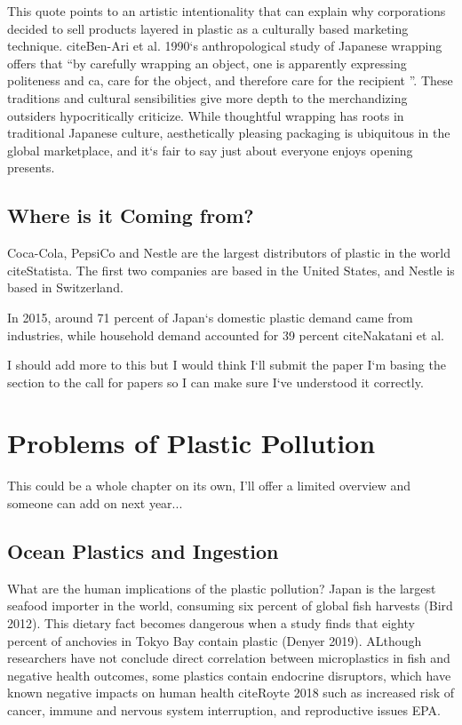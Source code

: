 \documentclass{book}\usepackage{knitr}
\begin{document}
This quote points to an artistic intentionality that can explain why corporations decided to sell products layered in plastic as a culturally based marketing technique. citeBen-Ari et al. 1990`s anthropological study of Japanese wrapping offers that ``by carefully wrapping an object, one is apparently expressing politeness and ca, care for the object, and therefore care for the recipient ''. These traditions and cultural sensibilities give more depth to the merchandizing outsiders hypocritically criticize. While thoughtful wrapping has roots in traditional Japanese culture, aesthetically pleasing packaging is ubiquitous in the global marketplace, and it`s fair to say just about everyone enjoys opening presents. 

\subsection{Where is it Coming from?}

Coca-Cola, PepsiCo and Nestle are the largest distributors of plastic in the world citeStatista. The first two companies are based in the United States, and Nestle is based in Switzerland. 

In 2015, around 71 percent of Japan`s domestic plastic demand came from industries, while household demand accounted for 39 percent citeNakatani et al. 

I should add more to this but I would think I`ll submit the paper I`m basing the section to the call for papers so I can make sure I`ve understood it correctly. 

\section{Problems of Plastic Pollution}

This could be a whole chapter on its own, I'll offer a limited overview and someone can add on next year...

\subsection{Ocean Plastics and Ingestion}

What are the human implications of the plastic pollution? Japan is the largest seafood importer in the world, consuming six percent of global fish harvests (Bird 2012). This dietary fact becomes dangerous when a study finds that eighty percent of anchovies in Tokyo Bay contain plastic (Denyer 2019). ALthough researchers have not conclude direct correlation between microplastics in fish and negative health outcomes, some plastics contain endocrine disruptors, which have known negative impacts on human health citeRoyte 2018 such as increased risk of cancer, immune and nervous system interruption, and reproductive issues EPA. 
\end{document}
